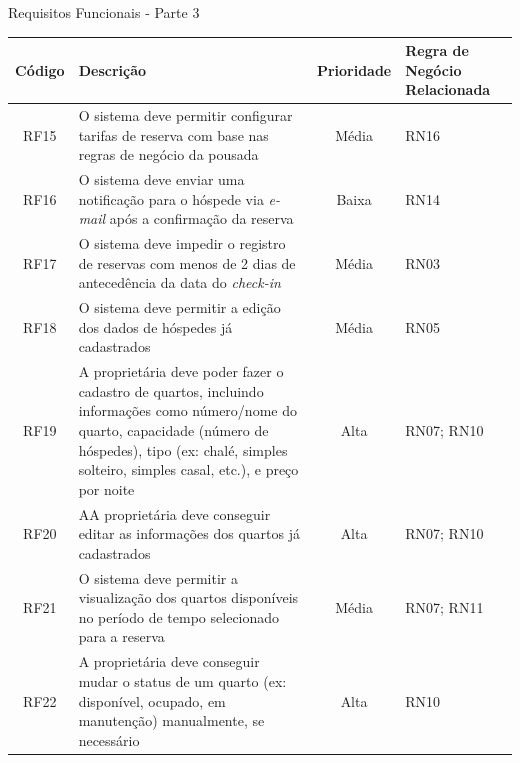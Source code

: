 \documentclass[
	12pt,				%
	openany,			%
	twoside,			%
	a4paper,			%
	english,			%
	french,				%
	spanish,			%
	brazil				%
	]{abntex2}
\begin{document}
\begin{quadro}[H]
	\caption{Requisitos Funcionais - Parte 3}
	\label{quadro_rf3}
	\begin{tabular}{|c|p{5cm}|c|p{4cm}|}
		\hline
		\textbf{Código} & \textbf{Descrição} & \textbf{Prioridade} & \textbf{Regra de Negócio Relacionada} \\ \hline
		RF15 & O sistema deve permitir configurar tarifas de reserva com base nas regras de negócio da pousada & Média & RN16 \\ \hline
		RF16 & O sistema deve enviar uma notificação para o hóspede via \textit{e-mail} após a confirmação da reserva & Baixa & RN14 \\ \hline
		RF17 & O sistema deve impedir o registro de reservas com menos de 2 dias de antecedência da data do \textit{check-in} & Média & RN03 \\ \hline
		RF18 & O sistema deve permitir  a edição dos dados de hóspedes já cadastrados & Média & RN05 \\ \hline
		RF19 & A proprietária deve poder fazer o cadastro de quartos, incluindo informações como número/nome do quarto, capacidade (número de hóspedes), tipo (ex: chalé, simples solteiro, simples casal, etc.), e preço por noite & Alta & RN07; RN10
		 \\ \hline
		 RF20 & AA proprietária deve conseguir editar as informações dos quartos já cadastrados & Alta & RN07; RN10\\ \hline
		 RF21 & O sistema deve permitir a visualização dos quartos disponíveis no período de tempo selecionado para a reserva & Média & RN07; RN11 \\ \hline
		 RF22 & A proprietária deve conseguir mudar o status de um quarto (ex: disponível, ocupado, em manutenção) manualmente, se necessário & Alta & RN10 \\ \hline
	\end{tabular}
\end{quadro}
\end{document}
